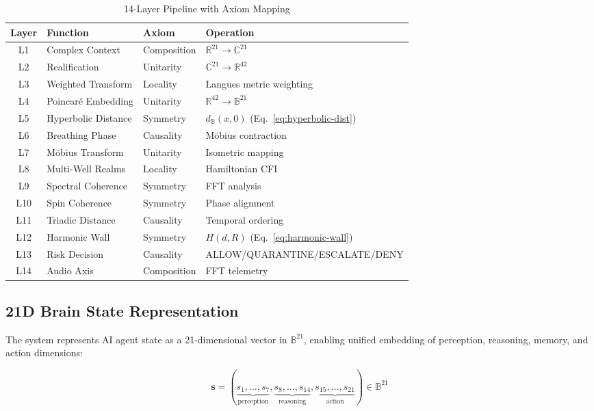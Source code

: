 \documentclass[11pt,a4paper]{article}
\newcommand{\BB}{\mathbb{B}}
\newcommand{\RR}{\mathbb{R}}
\begin{document}
\begin{table}[h]
\centering
\caption{14-Layer Pipeline with Axiom Mapping}
\label{tab:layers}
\begin{tabular}{@{}clll@{}}
\toprule
\textbf{Layer} & \textbf{Function} & \textbf{Axiom} & \textbf{Operation} \\
\midrule
L1  & Complex Context        & Composition  & $\RR^{21} \to \mathbb{C}^{21}$ \\
L2  & Realification          & Unitarity    & $\mathbb{C}^{21} \to \RR^{42}$ \\
L3  & Weighted Transform     & Locality     & Langues metric weighting \\
L4  & Poincar\'{e} Embedding & Unitarity    & $\RR^{42} \to \BB^{21}$ \\
L5  & Hyperbolic Distance    & Symmetry     & $d_\BB(x, 0)$ (Eq.~\ref{eq:hyperbolic-dist}) \\
L6  & Breathing Phase        & Causality    & M\"{o}bius contraction \\
L7  & M\"{o}bius Transform   & Unitarity    & Isometric mapping \\
L8  & Multi-Well Realms      & Locality     & Hamiltonian CFI \\
L9  & Spectral Coherence     & Symmetry     & FFT analysis \\
L10 & Spin Coherence         & Symmetry     & Phase alignment \\
L11 & Triadic Distance       & Causality    & Temporal ordering \\
L12 & Harmonic Wall          & Symmetry     & $H(d, R)$ (Eq.~\ref{eq:harmonic-wall}) \\
L13 & Risk Decision          & Causality    & ALLOW/QUARANTINE/ESCALATE/DENY \\
L14 & Audio Axis             & Composition  & FFT telemetry \\
\bottomrule
\end{tabular}
\end{table}

\subsection{21D Brain State Representation}

The system represents AI agent state as a 21-dimensional vector in
$\BB^{21}$, enabling unified embedding of perception, reasoning,
memory, and action dimensions:

\begin{equation}
  \mathbf{s} = (\underbrace{s_1, \ldots, s_7}_{\text{perception}},
  \underbrace{s_8, \ldots, s_{14}}_{\text{reasoning}},
  \underbrace{s_{15}, \ldots, s_{21}}_{\text{action}}) \in \BB^{21}
\end{equation}
\end{document}
